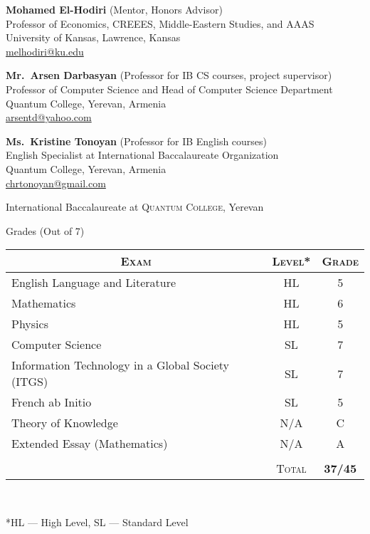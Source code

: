 \documentclass[a4paper,10pt]{article}
\begin{document}
\textbf{Mohamed El-Hodiri} (Mentor, Honors Advisor)\\
Professor of Economics, CREEES, Middle-Eastern Studies, and AAAS\\
University of Kansas, Lawrence, Kansas\\
\href{mailto:melhodiri@ku.edu}{melhodiri@ku.edu}

\textbf{Mr.\ Arsen Darbasyan} (Professor for IB CS courses, project supervisor)\\
Professor of Computer Science and Head of Computer Science Department\\
Quantum College, Yerevan, Armenia\\
\href{mailto:arsentd@yahoo.com}{arsentd@yahoo.com}

\textbf{Ms.\ Kristine Tonoyan} (Professor for IB English courses)\\
English Specialist at International Baccalaureate Organization\\
Quantum College, Yerevan, Armenia\\
\href{mailto:chrtonoyan@gmail.com}{chrtonoyan@gmail.com}

 \newpage
 \par{\centering\Large \hypertarget{ib_grades}{International Baccalaureate at \textsc{Quantum College}, Yerevan}\par}\large{\centering Grades (Out of 7) \par}\normalsize

 \begin{center}
 \begin{tabular}{lcc}
 \multicolumn{1}{c}{\textsc{Exam}}&\textsc{Level*}&\textsc{Grade}\\ \hline
   English Language and Literature	&HL&	5\\
   Mathematics	&HL&	6\\
   Physics	&HL&	5\\
   Computer Science & SL& 7\\
   Information Technology in a Global Society (ITGS) & SL& 7\\
   French ab Initio & SL & 5\\
   Theory of Knowledge & N/A & C\\
   Extended Essay (Mathematics) & N/A & A\\
 & &\\\cline{2-3}
  &\textsc{Total}&\textbf{37/45}
 \end{tabular}\\
 \begin{flushleft}
 \footnotesize{*HL --- High Level, SL --- Standard Level}
 \end{flushleft}
 \end{center}
\end{document}
